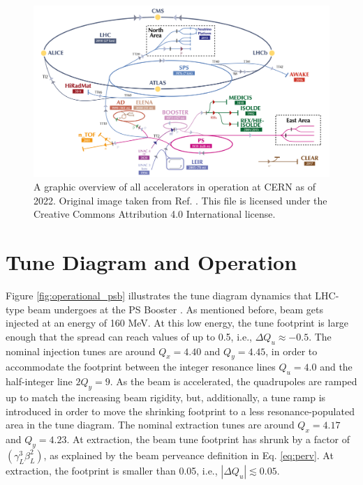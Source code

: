 \begin{figure}[H]
    \centering
    \includegraphics[width=\linewidth]{chapter5/CERN_AC.png}
    \caption{A graphic overview of all accelerators in operation at CERN as of 2022. Original image taken from Ref. \cite{cernplot}. This file is licensed under the Creative Commons Attribution 4.0 International license.}
    \label{fig:cernac}
\end{figure}

\section{Tune Diagram and Operation}

Figure \ref{fig:operational_psb} illustrates the tune diagram dynamics that LHC-type beam undergoes at the PS Booster \cite{foteini1,foteini2,albright}. As mentioned before, beam gets injected at an energy of 160 MeV. At this low energy, the tune footprint is large enough that the spread can reach values of up to 0.5, i.e., $\Delta Q_u \approx -0.5$. The nominal injection tunes are around $Q_x = 4.40$ and $Q_y = 4.45$, in order to accommodate the footprint between the integer resonance lines $Q_u= 4.0$ and the half-integer line $2Q_y=9$. As the beam is accelerated, the quadrupoles are ramped up to match the increasing beam rigidity, but, additionally, a tune ramp is introduced in order to move the shrinking footprint to a less resonance-populated area in the tune diagram. The nominal extraction tunes are around $Q_x = 4.17$ and $Q_y = 4.23$. At extraction, the beam tune footprint has shrunk by a factor of $(\gamma_L ^3 \beta_L ^2)$, as explained by the beam perveance definition in Eq. \ref{eq:perv}. At extraction, the footprint is smaller than 0.05, i.e., $| \Delta Q_u | \lesssim 0.05$.      

